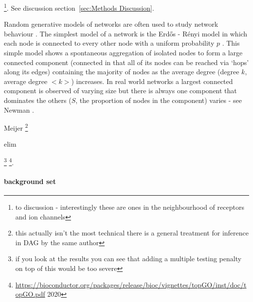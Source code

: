 \footnote{to discussion - interestingly these are ones in the neighbourhood of receptors and ion channels}. See discussion section~\ref{sec:Methods Discussion}.  

Random generative models of networks are often used to study network behaviour \cite{newman2018networks}. The simplest model of a network is the Erd{\H{o}}s - R{\'e}nyi\cite{erdHos1960evolution} model in which each node is connected to every other node with a uniform probability $p$ . This simple model shows a spontaneous aggregation of isolated nodes to form a large connected component  (connected in that all of its nodes can be reached via `hops' along its edges) containing the majority of nodes  as the average degree (degree $k$, average degree $<k>$) increases.  In real world networks a largest connected component is observed of varying size but there is always one component that dominates the others ($S$, the proportion of nodes in the component) varies - see Newman \cite{newman2018networks}.

Meijer
\footnote{this actually isn't the most technical there is a general treatment for inference in DAG by the same author} 


elim

\footnote{if you look at the results you can see that adding a multiple testing penalty on top of this would be too severe} \footnote{\url{https://bioconductor.org/packages/release/bioc/vignettes/topGO/inst/doc/topGO.pdf} 2020}.
\paragraph{background set}


